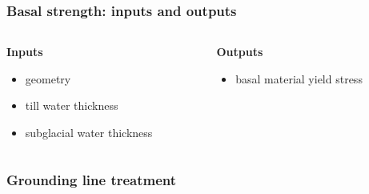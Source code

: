 \documentclass[hide notes,intlimits]{beamer}
\begin{document}
\begin{frame}
  \frametitle{Basal strength: inputs and outputs}

  \begin{columns}[t]
    \begin{column}{0.5\linewidth}
      \textbf{Inputs}

      \begin{itemize}
      \item geometry
      \item till water thickness
      \item subglacial water thickness
      \end{itemize}
    \end{column}
    \begin{column}{0.5\linewidth}
      \textbf{Outputs}

      \begin{itemize}
      \item basal material yield stress
      \end{itemize}
    \end{column}
  \end{columns}

\end{frame}


\begin{frame}
  \frametitle{Grounding line treatment}



\end{frame}
\end{document}
